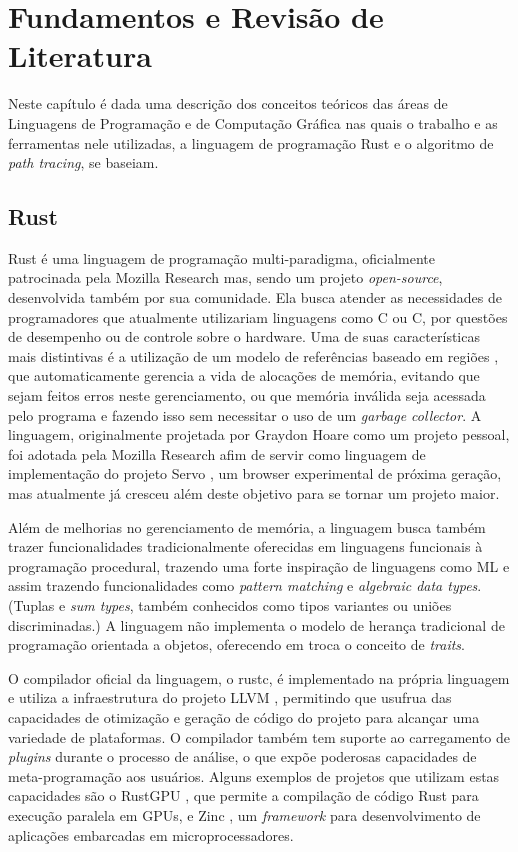 \documentclass[tg]{mdtufsm}
\def\Cpp{{C\nolinebreak[4]\raisebox{.20ex}{\small\bf++}}}
\begin{document}
\chapter{Fundamentos e Revisão de Literatura}

Neste capítulo é dada uma descrição dos conceitos teóricos das áreas de Linguagens de Programação e de Computação Gráfica nas quais o trabalho e as ferramentas nele utilizadas, a linguagem de programação Rust e o algoritmo de \emph{path tracing}, se baseiam.

\section{Rust}

Rust \citep{rust} é uma linguagem de programação multi-paradigma, oficialmente patrocinada pela
Mozilla Research mas, sendo um projeto \emph{open-source}, desenvolvida também por sua comunidade. Ela busca atender as necessidades
de programadores que atualmente utilizariam linguagens como C ou
\Cpp, por questões de desempenho ou de controle sobre o hardware. Uma de suas características mais
distintivas é a utilização de um modelo de referências baseado em regiões \citep{grossman2002}, que
automaticamente gerencia a vida de alocações de memória, evitando que sejam feitos erros neste
gerenciamento, ou que memória inválida seja acessada pelo programa e fazendo isso sem necessitar o uso de um
\emph{garbage collector}. A linguagem, originalmente projetada por Graydon Hoare como um projeto
pessoal, foi adotada pela Mozilla Research afim de servir como linguagem de
implementação do projeto Servo \citep{servo}, um browser experimental de próxima geração, mas
atualmente já cresceu além deste objetivo para se tornar um projeto maior.

Além de melhorias no gerenciamento de memória, a linguagem busca também trazer funcionalidades
tradicionalmente oferecidas em linguagens funcionais à programação procedural, trazendo uma forte inspiração de linguagens
como ML \citep{milner1997} e assim trazendo funcionalidades como \emph{pattern matching} e \emph{algebraic data types}. (Tuplas e \emph{sum types}, também conhecidos como tipos variantes ou uniões discriminadas.) A linguagem não implementa o modelo de herança tradicional de programação orientada a objetos,
oferecendo em troca o conceito de \emph{traits}.

O compilador oficial da linguagem, o rustc, é implementado na própria linguagem e utiliza a
infraestrutura do projeto LLVM \citep{lattner2004}, permitindo que usufrua das capacidades de
otimização e geração de código do projeto para alcançar uma variedade de plataformas. O compilador
também tem suporte ao carregamento de \emph{plugins} durante o processo de análise, o que expõe
poderosas capacidades de meta-programação aos usuários. Alguns exemplos de projetos que utilizam
estas capacidades são o RustGPU \citep{holk2013}, que permite a compilação de código Rust para
execução paralela em GPUs, e Zinc \citep{zinc}, um \emph{framework} para desenvolvimento de
aplicações embarcadas em microprocessadores.
\end{document}
